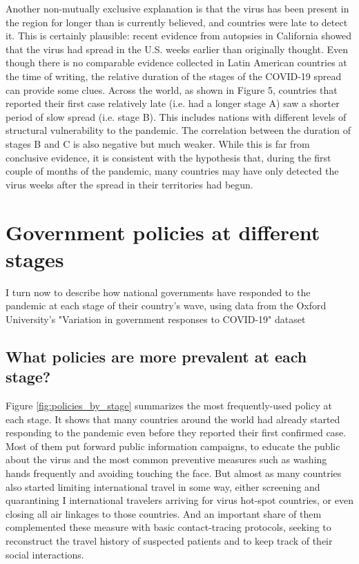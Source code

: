 \documentclass[12pt,english]{article}
\begin{document}
Another non-mutually exclusive explanation is that the virus has been present in the region for longer than is currently believed, and countries were late to detect it. This is certainly plausible: recent evidence from autopsies in California showed that the virus had spread in the U.S. weeks earlier than originally thought. Even though there is no comparable evidence collected in Latin American countries at the time of writing, the relative duration of the stages of the COVID-19 spread can provide some clues. Across the world, as shown in Figure 5, countries that reported their first case relatively late (i.e. had a longer stage A) saw a shorter period of slow spread (i.e. stage B). This includes nations with different levels of structural vulnerability to the pandemic.  The correlation between the duration of stages B and C is also negative but much weaker. While this is far from conclusive evidence, it is consistent with the hypothesis that, during the first couple of months of the pandemic, many countries may have only detected the virus weeks after the spread in their territories had begun.



\section{Government policies at different stages \label{sec:Policies}}

I turn now to describe how national governments have responded to the pandemic at each stage of their country's wave, using data from the Oxford University's "Variation in government responses to COVID-19" dataset  \citep{Hale2020}

\subsection{What policies are more prevalent at each stage? \label{subsec:Policies-by-stage}}

Figure \ref{fig:policies_by_stage} summarizes the most frequently-used policy at each stage. It shows that many countries around the world had already started responding to the pandemic even before they reported their first confirmed case.  Most of them put forward public information campaigns, to educate the public about the virus and the most common preventive measures such as washing hands frequently and avoiding touching the face.  But almost as many countries also started limiting international travel in some way, either screening and quarantining I international travelers arriving for virus hot-spot countries, or even closing all air linkages to those countries. And an important share of them complemented these measure with basic contact-tracing protocols, seeking to reconstruct the travel history of suspected patients and to keep track of their social interactions.
\end{document}
